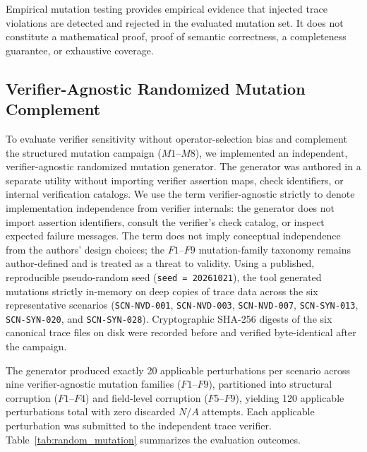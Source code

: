 \documentclass[conference]{IEEEtran}
\begin{document}
Empirical mutation testing provides empirical evidence that injected trace violations are detected and rejected in the evaluated mutation set. It does not constitute a mathematical proof, proof of semantic correctness, a completeness guarantee, or exhaustive coverage.

\subsection{Verifier-Agnostic Randomized Mutation Complement}

To evaluate verifier sensitivity without operator-selection bias and complement the structured mutation campaign ($M1$--$M8$), we implemented an independent, verifier-agnostic randomized mutation generator. The generator was authored in a separate utility without importing verifier assertion maps, check identifiers, or internal verification catalogs. We use the term verifier-agnostic strictly to denote implementation independence from verifier internals: the generator does not import assertion identifiers, consult the verifier's check catalog, or inspect expected failure messages. The term does not imply conceptual independence from the authors' design choices; the $F1$--$F9$ mutation-family taxonomy remains author-defined and is treated as a threat to validity. Using a published, reproducible pseudo-random seed (\texttt{seed = 20261021}), the tool generated mutations strictly in-memory on deep copies of trace data across the six representative scenarios (\texttt{SCN-NVD-001}, \texttt{SCN-NVD-003}, \texttt{SCN-NVD-007}, \texttt{SCN-SYN-013}, \texttt{SCN-SYN-020}, and \texttt{SCN-SYN-028}). Cryptographic SHA-256 digests of the six canonical trace files on disk were recorded before and verified byte-identical after the campaign.

The generator produced exactly 20 applicable perturbations per scenario across nine verifier-agnostic mutation families ($F1$--$F9$), partitioned into structural corruption ($F1$--$F4$) and field-level corruption ($F5$--$F9$), yielding 120 applicable perturbations total with zero discarded $N/A$ attempts. Each applicable perturbation was submitted to the independent trace verifier. Table~\ref{tab:random_mutation} summarizes the evaluation outcomes.
\end{document}
